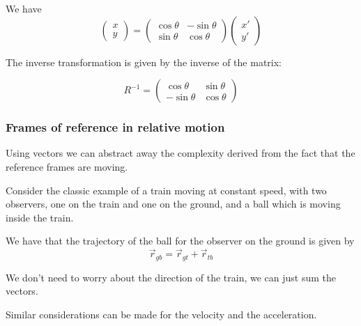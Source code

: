 \documentclass[14pt]{extarticle}
\begin{document}
We have
$$
  \begin{pmatrix}
    x \\
    y
  \end{pmatrix}
  =
  \begin{pmatrix}
    \cos \theta & -\sin \theta \\
    \sin \theta & \cos \theta
  \end{pmatrix}
  \begin{pmatrix}
    x' \\
    y'
  \end{pmatrix}
$$

The inverse transformation is given by the inverse of the matrix:

$$
  R^{-1} = \begin{pmatrix}
    \cos \theta  & \sin \theta \\
    -\sin \theta & \cos \theta
  \end{pmatrix}
$$

\subsubsection{Frames of reference in relative motion}

Using vectors we can abstract away the complexity derived from the fact that the reference frames are moving.

Consider the classic example of a train moving at constant speed, with two observers, one on the train and one on the ground,
and a ball which is moving inside the train.

We have that the trajectory of the ball for the observer on the ground is given by
$$
  \vec{r}_{gb} = \vec{r}_{gt} + \vec{r}_{tb}
$$

We don't need to worry about the direction of the train, we can just sum the vectors.

Similar considerations can be made for the velocity and the acceleration.
\end{document}
